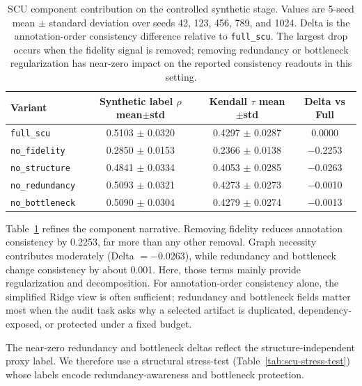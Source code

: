 \documentclass[a4paper,fleqn]{cas-sc}
\begin{document}
\begin{table}[ht]
\caption{SCU component contribution on the controlled synthetic stage. Values are 5-seed mean $\pm$ standard deviation over seeds 42, 123, 456, 789, and 1024. Delta is the annotation-order consistency difference relative to \texttt{full\_scu}. The largest drop occurs when the fidelity signal is removed; removing redundancy or bottleneck regularization has near-zero impact on the reported consistency readouts in this setting.}
\label{tab:scu-component-contribution}
\centering
\small
\renewcommand{\arraystretch}{1.08}
\begin{tabular}{lccc}
\toprule
\textbf{Variant} & \textbf{Synthetic label $\rho$ mean$\pm$std} & \textbf{Kendall $\tau$ mean$\pm$std} & \textbf{Delta vs Full} \\
\midrule
\texttt{full\_scu} & 0.5103 $\pm$ 0.0320 & 0.4297 $\pm$ 0.0287 & 0.0000 \\
\texttt{no\_fidelity} & 0.2850 $\pm$ 0.0153 & 0.2366 $\pm$ 0.0138 & $-$0.2253 \\
\texttt{no\_structure} & 0.4841 $\pm$ 0.0334 & 0.4053 $\pm$ 0.0285 & $-$0.0263 \\
\texttt{no\_redundancy} & 0.5093 $\pm$ 0.0321 & 0.4273 $\pm$ 0.0273 & $-$0.0010 \\
\texttt{no\_bottleneck} & 0.5090 $\pm$ 0.0304 & 0.4279 $\pm$ 0.0274 & $-$0.0013 \\
\bottomrule
\end{tabular}
\end{table}

Table~\ref{tab:scu-component-contribution} refines the component narrative. Removing fidelity reduces annotation consistency by 0.2253, far more than any other removal. Graph necessity contributes moderately (Delta $=-0.0263$), while redundancy and bottleneck change consistency by about 0.001. Here, those terms mainly provide regularization and decomposition. For annotation-order consistency alone, the simplified Ridge view is often sufficient; redundancy and bottleneck fields matter most when the audit task asks why a selected artifact is duplicated, dependency-exposed, or protected under a fixed budget.

The near-zero redundancy and bottleneck deltas reflect the structure-independent proxy label. We therefore use a structural stress-test (Table~\ref{tab:scu-stress-test}) whose labels encode redundancy-awareness and bottleneck protection.
\end{document}
